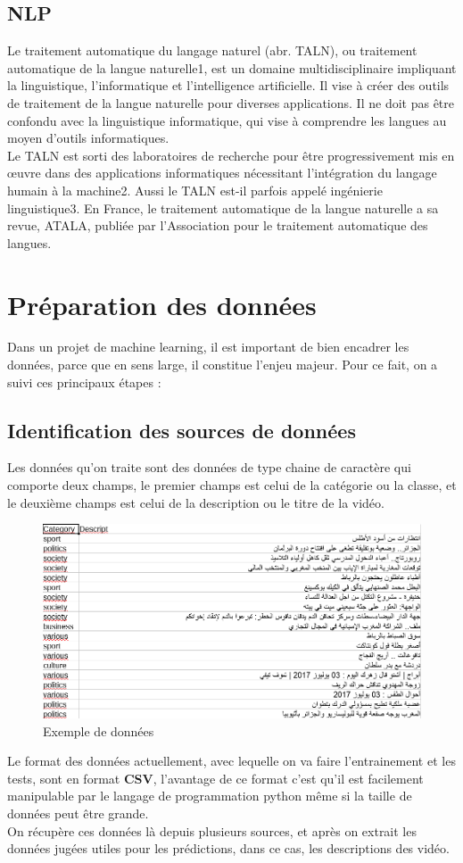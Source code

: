 \subsection{NLP}
Le traitement automatique du langage naturel (abr. TALN), ou traitement automatique de la langue naturelle1, est un domaine multidisciplinaire impliquant la linguistique, l'informatique et l'intelligence artificielle. Il vise à créer des outils de traitement de la langue naturelle pour diverses applications. Il ne doit pas être confondu avec la linguistique informatique, qui vise à comprendre les langues au moyen d'outils informatiques.\\[0.5cm]
Le TALN est sorti des laboratoires de recherche pour être progressivement mis en œuvre dans des applications informatiques nécessitant l'intégration du langage humain à la machine2. Aussi le TALN est-il parfois appelé ingénierie linguistique3. En France, le traitement automatique de la langue naturelle a sa revue, ATALA, publiée par l’Association pour le traitement automatique des langues.




\section{Préparation des données}	
Dans un projet de machine learning, il est important de bien encadrer les données, parce que en sens large, il constitue l'enjeu majeur. Pour ce fait, on a suivi ces principaux étapes :
\subsection{Identification des sources de données}
Les données qu'on traite sont des données de type chaine de caractère qui comporte deux champs, le premier champs est celui de la catégorie ou la classe, et le deuxième champs est celui de la description ou le titre de la vidéo.
\begin{figure}[H]
	\includegraphics[width=\linewidth]{Images/donnees_contenu.png}
	\caption{Exemple de données}
	\label{fig:donnees}
\end{figure}	
Le format des données actuellement, avec lequelle on va faire l'entrainement et les tests, sont en format \textbf{CSV}, l'avantage de ce format c'est qu'il est facilement manipulable par le langage de programmation python même si la taille de données peut être grande.\\[0.2cm]
On récupère ces données là depuis plusieurs sources, et après on extrait les données jugées utiles pour les prédictions, dans ce cas, les descriptions des vidéo.
